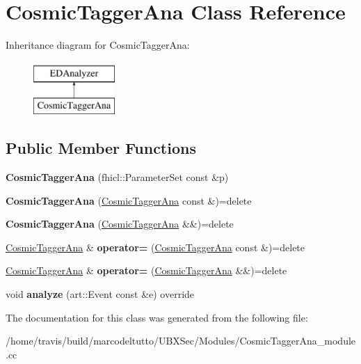 \hypertarget{classCosmicTaggerAna}{\section{Cosmic\-Tagger\-Ana Class Reference}
\label{classCosmicTaggerAna}
}
Inheritance diagram for Cosmic\-Tagger\-Ana\-:\begin{figure}[H]
\begin{center}
\leavevmode
\includegraphics[height=2.000000cm]{classCosmicTaggerAna}
\end{center}
\end{figure}
\subsection*{Public Member Functions}
\begin{DoxyCompactItemize}
\item 
\hypertarget{classCosmicTaggerAna_a057039c409136601ac09420faf77c099}{{\bfseries Cosmic\-Tagger\-Ana} (fhicl\-::\-Parameter\-Set const \&p)}\label{classCosmicTaggerAna_a057039c409136601ac09420faf77c099}

\item 
\hypertarget{classCosmicTaggerAna_ae97386c9238c955b1b84fabe9ad2803c}{{\bfseries Cosmic\-Tagger\-Ana} (\hyperlink{classCosmicTaggerAna}{Cosmic\-Tagger\-Ana} const \&)=delete}\label{classCosmicTaggerAna_ae97386c9238c955b1b84fabe9ad2803c}

\item 
\hypertarget{classCosmicTaggerAna_aaa8d188e33c5787293c92dfcb99679c3}{{\bfseries Cosmic\-Tagger\-Ana} (\hyperlink{classCosmicTaggerAna}{Cosmic\-Tagger\-Ana} \&\&)=delete}\label{classCosmicTaggerAna_aaa8d188e33c5787293c92dfcb99679c3}

\item 
\hypertarget{classCosmicTaggerAna_ab28bec4bf2d71de7f6adcaa6d57a8c50}{\hyperlink{classCosmicTaggerAna}{Cosmic\-Tagger\-Ana} \& {\bfseries operator=} (\hyperlink{classCosmicTaggerAna}{Cosmic\-Tagger\-Ana} const \&)=delete}\label{classCosmicTaggerAna_ab28bec4bf2d71de7f6adcaa6d57a8c50}

\item 
\hypertarget{classCosmicTaggerAna_a0ff825d46a57593ef95d8139b92861a8}{\hyperlink{classCosmicTaggerAna}{Cosmic\-Tagger\-Ana} \& {\bfseries operator=} (\hyperlink{classCosmicTaggerAna}{Cosmic\-Tagger\-Ana} \&\&)=delete}\label{classCosmicTaggerAna_a0ff825d46a57593ef95d8139b92861a8}

\item 
\hypertarget{classCosmicTaggerAna_aea04b9a8752a0730aa18c81d298decf9}{void {\bfseries analyze} (art\-::\-Event const \&e) override}\label{classCosmicTaggerAna_aea04b9a8752a0730aa18c81d298decf9}

\end{DoxyCompactItemize}


The documentation for this class was generated from the following file\-:\begin{DoxyCompactItemize}
\item 
/home/travis/build/marcodeltutto/\-U\-B\-X\-Sec/\-Modules/Cosmic\-Tagger\-Ana\-\_\-module.\-cc\end{DoxyCompactItemize}
